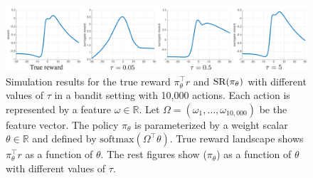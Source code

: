 \begin{figure}[t]
\begin{center}
\includegraphics[width=1.0\linewidth]{./sr_simulation.pdf}
\end{center}
\caption{
Simulation results for the true reward $\pi_\theta^\top r$ and $\text{SR}(\pi_\theta)$
with different values of $\tau$ in a bandit setting with 10,000 actions. Each action is represented by a feature $\omega\in \mathbb{R}$. Let $\Omega = \left( \omega_1, \dots, \omega_{10,000} \right)$ be the feature vector. The policy $\pi_\theta$ is parameterized by a weight scalar $\theta\in \mathbb{R}$ and defined by $\text{softmax}(\Omega^{\top}\theta)$. True reward landscape shows $\pi_\theta^\top r$ as a function of $\theta$. The rest figures show \SR($\pi_\theta$) as a function of $\theta$ with different values of $\tau$.}
\label{fig:srsimulation}
\end{figure}
\fi

